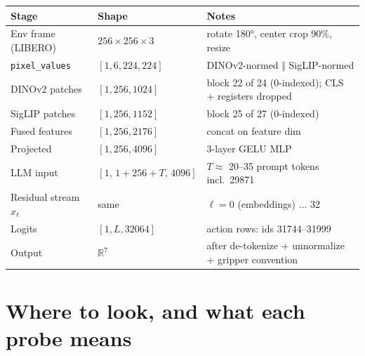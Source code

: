 \documentclass[11pt]{article}
\begin{document}
\begin{center}
\begin{tabular}{@{}lll@{}}
\toprule
Stage & Shape & Notes \\
\midrule
Env frame (LIBERO) & $256\times256\times3$ & rotate 180°, center crop 90\%, resize \\
\texttt{pixel\_values} & $[1,6,224,224]$ & DINOv2-normed $\Vert$ SigLIP-normed \\
DINOv2 patches & $[1,256,1024]$ & block 22 of 24 (0-indexed); CLS + registers dropped \\
SigLIP patches & $[1,256,1152]$ & block 25 of 27 (0-indexed) \\
Fused features & $[1,256,2176]$ & concat on feature dim \\
Projected & $[1,256,4096]$ & 3-layer GELU MLP \\
LLM input & $[1,\,1{+}256{+}T,\,4096]$ & $T\approx$ 20--35 prompt tokens incl.\ 29871 \\
Residual stream $x_\ell$ & same & $\ell=0$ (embeddings) $\ldots$ 32 \\
Logits & $[1,L,32064]$ & action rows: ids 31744--31999 \\
Output & $\mathbb{R}^7$ & after de-tokenize + unnormalize + gripper convention \\
\bottomrule
\end{tabular}
\end{center}

\section{Where to look, and what each probe means}
\end{document}
